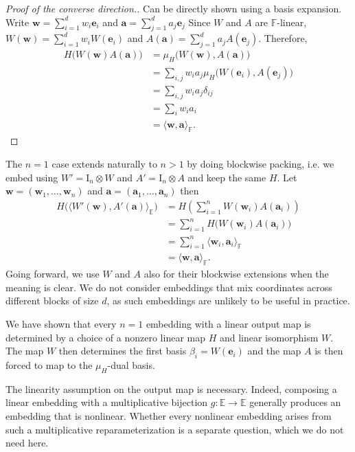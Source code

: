 \begin{proof}[Proof of the converse direction.] Can be directly shown using a basis expansion. 
Write $\mathbf w=\sum_{i=1}^d w_i\mathbf e_i$ and $\mathbf a=\sum_{j=1}^d a_j\mathbf e_j$
Since $W$ and $A$ are $\mathbb F$-linear, $W(\mathbf w) = \sum_{i=1}^d w_iW(\mathbf e_i)$ and $A(\mathbf a) = \sum_{j=1}^d a_jA(\mathbf e_j)$. Therefore,
\[
\begin{aligned}
H\bigl(W(\mathbf w)A(\mathbf a)\bigr)
&=
\mu_H\bigl(W(\mathbf w),A(\mathbf a)\bigr)\\
&=
\sum_{i,j}
w_i a_j
\mu_H\bigl(W(\mathbf e_i),A(\mathbf e_j)\bigr)\\
&=
\sum_{i,j}
w_i a_j\delta_{ij}\\
&=
\sum_iw_ia_i\\
&=
\langle\mathbf w,\mathbf a\rangle_{\mathbb F}.
\end{aligned}
\]
\end{proof}

The $n=1$ case extends naturally to $n>1$ by doing blockwise packing, i.e. we embed using $W' = \mathrm{I}_n \otimes W$ and $A' = \mathrm{I}_n \otimes A$ and keep the same $H$. Let $\mathbf{w} = (\mathbf{w}_1, \dots, \mathbf{w}_n)$ and $\mathbf{a} = (\mathbf{a}_1, \dots, \mathbf{a}_n)$ then
\[
\begin{aligned}
H\bigl( \langle W'(\mathbf{w}), A'(\mathbf{a}) \rangle_{\mathbb{E}} \bigr)
&= H\left( \sum_{i=1}^n W(\mathbf{w}_i) A(\mathbf{a}_i) \right) \\
&= \sum_{i=1}^n H\bigl( W(\mathbf{w}_i) A(\mathbf{a}_i) \bigr) \\
&= \sum_{i=1}^n \langle \mathbf{w}_i,\mathbf{a}_i \rangle_{\mathbb{F}} \\
&= \langle \mathbf{w},\mathbf{a} \rangle_{\mathbb{F}}.
\end{aligned}
\]
Going forward, we use $W$ and $A$ also for their blockwise extensions when the meaning is clear. We do not consider embeddings that mix coordinates across different blocks of size $d$, as such embeddings are unlikely to be useful in practice.

We have shown that every $n=1$ embedding with a linear output map is determined by a choice of a nonzero linear map $H$ and linear isomorphism $W$. The map $W$ then determines the first basis $\beta_i=W(\mathbf e_i)$ and the map $A$ is then forced to map to the $\mu_H$-dual basis.

The linearity assumption on the output map is necessary. Indeed, composing a linear embedding with a multiplicative bijection $g:\mathbb E\to\mathbb E$ generally produces an embedding that is nonlinear. Whether every nonlinear embedding arises from such a multiplicative reparameterization is a separate question, which we do not need here.

